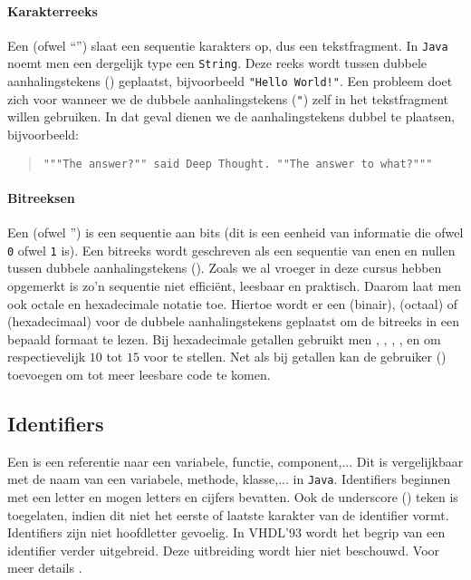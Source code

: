 \paragraph{Karakterreeks}
Een  (ofwel ``'') slaat een sequentie karakters op, dus een tekstfragment. In \texttt{Java} noemt men een dergelijk type een \texttt{String}. Deze reeks wordt tussen dubbele aanhalingstekens () geplaatst, bijvoorbeeld \texttt{"Hello World!"}. Een probleem doet zich voor wanneer we de dubbele aanhalingstekens (\texttt{"}) zelf in het tekstfragment willen gebruiken. In dat geval dienen we de aanhalingstekens dubbel te plaatsen, bijvoorbeeld:
\begin{quote}\verb+"""The answer?"" said Deep Thought. ""The answer to what?"""+\cite[\S25]{Adams81BOOK54}\end{quote}
\paragraph{Bitreeksen}
Een  (ofwel '') is een sequentie aan bits (dit is een eenheid van informatie die ofwel \texttt{0} ofwel \texttt{1} is). Een bitreeks wordt geschreven als een sequentie van enen en nullen tussen dubbele aanhalingstekens (). Zoals we al vroeger in deze cursus hebben opgemerkt is zo'n sequentie niet effici\"ent, leesbaar en praktisch. Daarom laat men ook octale  en hexadecimale notatie toe. Hiertoe wordt er een  (binair),  (octaal) of  (hexadecimaal) voor de dubbele aanhalingstekens geplaatst om de bitreeks in een bepaald formaat te lezen. Bij hexadecimale getallen gebruikt men , , , ,  en  om respectievelijk $10$ tot $15$ voor te stellen. Net als bij getallen kan de gebruiker  (\vhdltermen{\_}) toevoegen om tot meer leesbare code te komen.
\subsection{Identifiers}
Een  is een referentie naar een variabele, functie, component,... Dit is vergelijkbaar met de naam van een variabele, methode, klasse,... in \texttt{Java}. Identifiers beginnen met een letter en mogen letters en cijfers bevatten. Ook de underscore (\vhdltermen{\_}) teken is toegelaten, indien dit niet het eerste of laatste karakter van de identifier vormt. Identifiers zijn niet hoofdletter gevoelig. In VHDL'93 wordt het begrip van een identifier verder uitgebreid. Deze uitbreiding wordt hier niet beschouwd. Voor meer details \cite[p. 4]{hardi00}.
